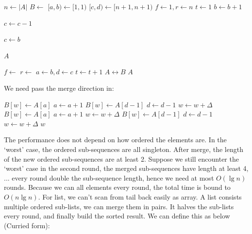 \documentclass[b5paper]{article}
\begin{document}
\begin{algorithmic}[1]
    \State $n \gets |A|$
    \State $B \gets$   
    \Loop
      \State $[a, b) \gets [1, 1)$
      \State $[c, d) \gets [n+1, n+1)$
      \State $f \gets 1, r \gets n$ 
      \State $t \gets 1$            
                     
        \Repeat \Comment{Span $[a, b)$}
          \State $b \gets b + 1$

        \Repeat \Comment{Span $[c, d)$}
          \State $c \gets c - 1$

         
          \State $c \gets b$
        \EndIf

         \Comment{Terminates if $[a, b)$ spans the whole array}
          \State \Return $A$
        \EndIf

         
          \State $f \gets$ \Call{Merge}{$A, [a, b), [c, d), B, f, 1$}
        \Else {}
          \State $r \gets$ \Call{Merge}{$A, [a, b), [c, d), B, r, -1$}
        \EndIf
        \State $a \gets b, d \gets c$
        \State $t \gets t + 1$
      \EndWhile
      \State {} $A \leftrightarrow B$ 
    \EndLoop
  \EndIf
  \State \Return $A$
\EndFunction
\end{algorithmic}

We need pass the merge direction in:

\begin{algorithmic}[1]
\Function{Merge}{$A, [a, b), [c, d), B, w, \Delta$}
      \State $B[w] \gets A[a]$
      \State $a \gets a + 1$
    \Else
      \State $B[w] \gets A[d-1]$
      \State $d \gets d - 1$
    \EndIf
    \State $w \gets w + \Delta$
  \EndWhile
    \State $B[w] \gets A[a]$
    \State $a \gets a + 1$
    \State $w \gets w + \Delta$
  \EndWhile
    \State $B[w] \gets A[d-1]$
    \State $d \gets d - 1$
    \State $w \gets w + \Delta$
  \EndWhile
  \State \Return $w$
\EndFunction
\end{algorithmic}

The performance does not depend on how ordered the elements are. In the `worst' case, the ordered sub-sequences are all singleton. After merge, the length of the new ordered sub-sequences are at least 2. Suppose we still encounter the `worst' case in the second round, the merged sub-sequences have length at least 4, ... every round double the sub-sequence length, hence we need at most $O(\lg n)$ rounds. Because we can all elements every round, the total time is bound to $O(n \lg n)$. For list, we can't scan from tail back easily as array. A list consists multiple ordered sub-lists, we can merge them in pairs. It halves the sub-lists every round, and finally build the sorted result. We can define this as below (Curried form):
\end{document}
